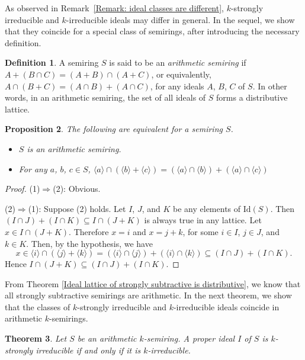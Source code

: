 \documentclass[11pt,leqno]{amsart}
\newtheorem{theorem}{Theorem}[section]
\newtheorem{proposition}[theorem]{Proposition}
\theoremstyle{definition}
\newtheorem{definition}[theorem]{Definition}
\numberwithin{equation}{section}
\begin{document}
As observed in Remark~\ref{Remark: ideal classes are different}, $k$-strongly irreducible and $k$-irreducible ideals may differ in general. In the sequel, we show that they coincide for a special class of semirings, after introducing the necessary definition.

\begin{definition}\label{Definition: arithmetic semiring}
    A semiring $S$ is said to be an \emph{arithmetic semiring} if 
        $A+(B \cap C)= (A+B) \cap (A+C)$, or equivalently,  
        $A \cap (B+C)= (A \cap B)+(A \cap C)$, for any ideals $A$, $B$, $C$ of $S$. In other words, in an arithmetic semiring, the set of all ideals of  $S$ forms a distributive lattice.
    
\end{definition}

\begin{proposition}
    The following are equivalent for a semiring $S$.
    \begin{itemize}
        \item[1.] $S$ is an arithmetic semiring.
        \item[2.] For any $a$, $b$, $c\in S$, $\langle a\rangle\cap (\langle b\rangle +\langle c\rangle)=(\langle a\rangle \cap \langle b\rangle)+(\langle a\rangle\cap \langle c\rangle)$ 
    \end{itemize}
\end{proposition}

\begin{proof}
    (1)$\Rightarrow$(2): Obvious.

    (2)$\Rightarrow$(1): Suppose (2) holds. Let $I$, $J$, and $K$ be any elements of $\mathrm{Id}(S)$. Then $(I\cap J)+(I\cap K)\subseteq I\cap (J+K)$ is always true in any lattice. Let $x\in I\cap (J+K)$. Therefore $x=i$ and $x=j+k$, for some $i\in I$, $j\in J$, and $k\in K$. Then, by the hypothesis, we have 
    \[x\in \langle i \rangle \cap (\langle j \rangle + \langle k \rangle) = (\langle i \rangle \cap \langle j \rangle)+(\langle i \rangle \cap \langle k \rangle) \subseteq (I\cap J)+(I\cap K).\]
    Hence $I\cap (J+K)\subseteq (I\cap J)+(I\cap K)$.
\end{proof}

From Theorem \ref{Ideal lattice of strongly subtractive is distributive}, we know that all strongly subtractive semirings are arithmetic. In the next theorem, we show that the classes of $k$-strongly irreducible and $k$-irreducible ideals coincide in arithmetic $k$-semirings. 
\begin{theorem}
    Let $S$ be an arithmetic $k$-semiring. A proper ideal $I$ of $S$ is $k$-strongly irreducible if and only if it is $k$-irreducible.
\end{theorem}
\end{document}
